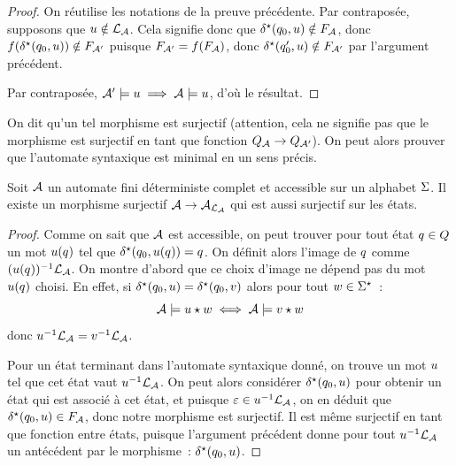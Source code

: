 \begin{proof}
  On réutilise les notations de la preuve précédente. Par contraposée, supposons
  que $u \notin \mathcal L_{\mathcal{A}}$. Cela signifie donc que
  $\delta_{}^{\star}(q_{0},u) \notin F_{\mathcal{A}}$, donc
  $f(\delta_{}^{\star}(q_{0},u)) \notin F_{\mathcal{A}'}$ puisque
  $F_{\mathcal{A}'} = f(F_{\mathcal{A}})$, donc $\delta_{}^{\star}(q_{0}',u)\notin F_{\mathcal{A}'}$ par
  l'argument précédent.

  Par contraposée, $\mathcal{A}'\models u \implies \mathcal{A} \models u$, d'où
  le résultat.
\end{proof}

On dit qu'un tel morphisme est surjectif (attention, cela ne signifie pas que le
morphisme est surjectif en tant que fonction $Q_{\mathcal{A}} \to Q_{\mathcal{A}'}$).
On peut alors prouver que l'automate syntaxique est minimal en un sens précis.

\begin{proposition}
  Soit $\mathcal{A}$ un automate fini déterministe complet et accessible sur un
  alphabet $\Sigma$. Il existe un morphisme surjectif
  $\mathcal{A} \to \mathcal{A}_{\mathcal L_{\mathcal{A}}}$ qui est aussi surjectif sur les états.
\end{proposition}

\begin{proof}
  Comme on sait que $\mathcal{A}$ est accessible, on peut trouver pour tout état
  $q_{} \in Q_{}$ un mot $u(q_{})$ tel que
  $\delta_{}^{\star}(q_{0},u(q_{})) = q_{}$. On définit alors l'image de $q_{}$ comme
  $(u(q_{}))^{-1}\mathcal L_{\mathcal{A}}$. On montre d'abord que
  ce choix d'image ne dépend pas du mot $u(q_{})$ choisi. En effet, si
  $\delta_{}^{\star}(q_{0},u) = \delta_{}^{\star}(q_{0},v)$ alors pour tout
  $w \in \Sigma^{\star}$~:
  \[\mathcal{A} \models u\mathbin{\star}w \iff \mathcal{A} \models v\mathbin{\star}w\]
  donc $u^{-1}\mathcal L_{\mathcal{A}}= v^{-1}\mathcal L_{\mathcal{A}}$.

  Pour un état terminant dans l'automate syntaxique donné, on trouve un mot
  $u$ tel que cet état vaut $u^{-1}\mathcal L_{\mathcal{A}}$. On peut
  alors considérer $\delta_{}^{\star}(q_{0},u)$ pour obtenir un état qui est associé à
  cet état, et puisque $\varepsilon \in u^{-1}\mathcal L_{\mathcal{A}}$, on en déduit
  que $\delta_{}^{\star}(q_{0},u)\in F_{\mathcal{A}}$, donc notre morphisme est surjectif. Il
  est même surjectif en tant que fonction entre états, puisque l'argument
  précédent donne pour tout $u^{-1}\mathcal L_{\mathcal{A}}$ un antécédent par
  le morphisme~: $\delta_{}^{\star}(q_{0},u)$.
\end{proof}


